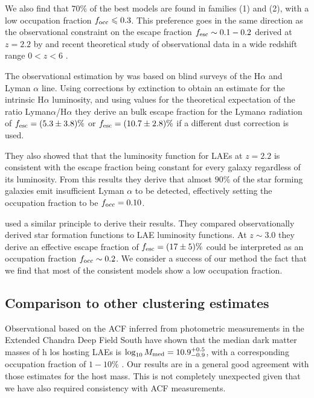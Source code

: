 \documentclass[usenatbib]{mn2e}
\newcommand{\Msun}{{\ifmmode{{\rm {M_{\odot}}}}\else{${\rm{M_{\odot}}}$}\fi}}
\begin{document}
We also find that $70\%$ of the best models are found in families (1)
and (2), with a low occupation fraction $f_{\rm occ}\leq 0.3$. This
preference goes in the same direction as the observational constraint
on the escape fraction $f_{\rm esc}\sim 0.1-0.2$ derived at $z=2.2$ by
\cite{Hayes2010} and recent theoretical study of observational data in
a wide redshift range $0<z<6$  \citep{Dijkstra2013}. 

The observational estimation by \cite{Hayes2010} was based on blind
surveys of the H$\alpha$ and Lyman $\alpha$ line. Using corrections by
extinction to obtain an estimate for the intrinsic H$\alpha$
luminosity, and using values for the theoretical expectation of the
ratio Lyman$\alpha$/H$\alpha$ they derive an bulk escape fraction for
the Lyman$\alpha$ radiation of $f_{\rm esc}=(5.3\pm 3.8)\%$ or $f_{\rm
  esc}=(10.7\pm 2.8)\%$ if a different dust correction is used. 

They also showed that that the luminosity function for LAEs at $z=2.2$ is
consistent with the escape fraction being constant for every galaxy
regardless of its luminosity. From this results they derive that
almost $90\%$ of the star forming galaxies emit insufficient
Lyman $\alpha$ to be detected, effectively setting the occupation
fraction to be $f_{\rm occ}=0.10$.  

\cite{Dijkstra2013} used a similar principle to derive their results. They
compared observationally derived star formation functions to LAE
luminosity functions. At $z\sim 3.0$ they derive an effective escape
fraction of $f_{\rm esc}=(17\pm 5)\%$ could be interpreted as an
occupation fraction $f_{\rm occ}\sim 0.2$.  We consider a success of
our method the fact that we find that most of the consistent models
show a low occupation fraction.    



\subsection{Comparison to other clustering estimates}

Observational based on the ACF inferred from photometric measurements
in the Extended Chandra Deep Field South have shown that the median
dark matter masses of h los hosting LAEs is $\log_{10}M_{\rm
  med}=10.9^{+0.5}_{-0.9}$\Msun, with a corresponding occupation
fraction of $1-10\%$  \citep{Gawiser07}.  Our results are in a general
good agreement with those estimates for the host mass. This is not
completely unexpected given that we have also required consistency
with ACF measurements.   
\end{document}
